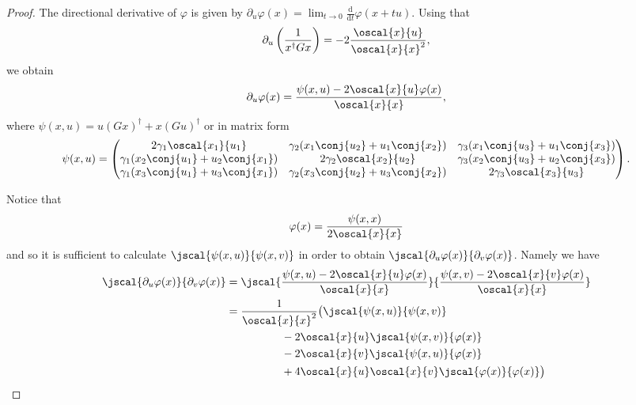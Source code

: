 \begin{proof}
The  directional derivative of $\varphi$ is given by $\partial_u \varphi(x) = \lim_{t\to 0} \frac{\mathrm{d}}{\mathrm{d}t} \varphi(x+tu)$. Using that 
\[\partial_u \left( \frac{1}{x^\dagger G x} \right) = - 2\frac{\oscal{x}{u}}{\oscal{x}{x}^2},
\]
we obtain
\[
\partial_u \varphi(x) = \frac{\psi(x,u) - 2\oscal{x}{u}\varphi(x)}{\oscal{x}{x}},
\]
where $\psi(x,u) = u(Gx)^\dagger + x(Gu)^\dagger$ or in matrix form
\[
\psi(x,u) =
\begin{pmatrix}
2\gamma_1\oscal{x_1}{u_1} & \gamma_2(x_1\conj{u_2} + u_1\conj{x_2}) & \gamma_3(x_1\conj{u_3} + u_1\conj{x_3})  \\
\gamma_1(x_2\conj{u_1} + u_2\conj{x_1}) & 2\gamma_2\oscal{x_2}{u_2} & \gamma_3(x_2\conj{u_3} + u_2\conj{x_3})  \\
\gamma_1(x_3\conj{u_1} + u_3\conj{x_1}) & \gamma_2(x_3\conj{u_2} + u_3\conj{x_2}) & 2\gamma_3\oscal{x_3}{u_3}
\end{pmatrix}.
\]

Notice that 
\[
\varphi(x) = \frac{\psi(x,x)}{2\oscal{x}{x}}
\]
and so it is sufficient to calculate $\jscal{\psi(x,u)}{\psi(x,v)}$ in order to obtain $\jscal{\partial_u \varphi(x)}{\partial_v \varphi(x)}$. Namely we have
\begin{equation}\label{eq:jscal2}
\begin{aligned}
\jscal{\partial_u \varphi(x)}{\partial_v \varphi(x)} 
		& = \jscal{\frac{\psi(x,u) - 2\oscal{x}{u}\varphi(x)}{\oscal{x}{x}}}{\frac{\psi(x,v) - 2\oscal{x}{v}\varphi(x)}{\oscal{x}{x}}} \\
        & = \frac{1}{\oscal{x}{x}^2} \bigl( \jscal{\psi(x,u)}{\psi(x,v)} \\
		& \qquad \qquad \quad - 2\oscal{x}{u}\jscal{\psi(x,v)}{\varphi(x)}\\ 
        & \qquad \qquad \quad - 2\oscal{x}{v}\jscal{\psi(x,u)}{\varphi(x)} \\
		& \qquad \qquad \quad +  4\oscal{x}{u}\oscal{x}{v}\jscal{\varphi(x)}{\varphi(x)} \bigr) \\
\end{aligned}
\end{equation}


\end{proof}
